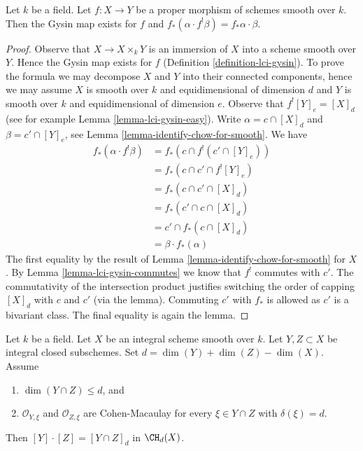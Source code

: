 \begin{lemma}
\label{lemma-projection-formula}
Let $k$ be a field. Let $f : X \to Y$ be a proper morphism of schemes smooth
over $k$. Then the Gysin map exists for $f$ and
$f_*(\alpha \cdot f^!\beta) = f_*\alpha \cdot \beta$.
\end{lemma}

\begin{proof}
Observe that $X \to X \times_k Y$ is an immersion of $X$ into a scheme
smooth over $Y$. Hence the Gysin map exists for $f$
(Definition \ref{definition-lci-gysin}).
To prove the formula we may decompose $X$ and $Y$ into their
connected components, hence we may assume $X$ is smooth over $k$
and equidimensional of dimension $d$ and $Y$ is smooth over $k$
and equidimensional of dimension $e$. Observe that
$f^![Y]_e = [X]_d$ (see for example Lemma \ref{lemma-lci-gysin-easy}).
Write $\alpha = c \cap [X]_d$ and $\beta = c' \cap [Y]_e$,
see Lemma \ref{lemma-identify-chow-for-smooth}. We have
\begin{align*}
f_*(\alpha \cdot f^!\beta)
& =
f_*(c \cap f^!(c' \cap [Y]_e)) \\
& =
f_*(c \cap c' \cap f^![Y]_e) \\
& =
f_*(c \cap c' \cap [X]_d) \\
& =
f_*(c' \cap c \cap [X]_d) \\
& =
c' \cap f_*(c \cap [X]_d) \\
& =
\beta \cdot f_*(\alpha)
\end{align*}
The first equality by the result of Lemma \ref{lemma-identify-chow-for-smooth}
for $X$. By Lemma \ref{lemma-lci-gysin-commutes} we know that $f^!$
commutes with $c'$. The commutativity of the intersection
product justifies switching the order of capping $[X]_d$ with $c$ and $c'$
(via the lemma). Commuting $c'$ with $f_*$ is allowed as $c'$
is a bivariant class. The final equality is again the lemma.
\end{proof}

\begin{lemma}
\label{lemma-intersect-properly}
Let $k$ be a field. Let $X$ be an integral scheme smooth over $k$.
Let $Y, Z \subset X$ be integral closed subschemes. Set
$d = \dim(Y) + \dim(Z) - \dim(X)$. Assume
\begin{enumerate}
\item $\dim(Y \cap Z) \leq d$, and
\item $\mathcal{O}_{Y, \xi}$ and $\mathcal{O}_{Z, \xi}$
are Cohen-Macaulay for every $\xi \in Y \cap Z$ with
$\delta(\xi) = d$.
\end{enumerate}
Then $[Y] \cdot [Z] = [Y \cap Z]_d$ in $\CH_d(X)$.
\end{lemma}

